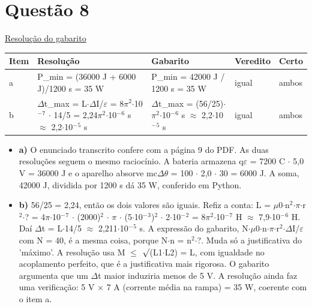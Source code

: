 \documentclass{article}%
\begin{document}
\section*{Questão 8}%
\href{https://poliedroresolve.sistemapoliedro.com.br/vestibulares/ita/2026/ita-2-fase-dia-3-30-10-2025-2-fase-dia-3/dissertativa-8-fisica-2-fase-dia-3-ita-2026}{Resolução do gabarito}\par\smallskip%
\begin{longtable}{@{}p{} p{} p{} p{} p{}@{}}\toprule Item & Resolução & Gabarito & Veredito & Certo \\ \midrule
a & P\_min = (36000 J + 6000 J)/1200 s = 35 W & P\_min = 42000 J / 1200 s = 35 W & igual & ambos \\
b & $\Delta$t\_max = L$\cdot$$\Delta$I/$\varepsilon$ = 8$\pi$$^2$$\cdot$10$^{-}$$^{7}$ $\cdot$ 14/5 = 2,24$\pi$$^2$$\cdot$10$^{-}$$^{6}$ s $\approx$ 2,2$\cdot$10$^{-}$$^{5}$ s & $\Delta$t\_max = (56/25)$\cdot$$\pi$$^2$$\cdot$10$^{-}$$^{6}$ s $\approx$ 2,2$\cdot$10$^{-}$$^{5}$ s & igual & ambos \\
\bottomrule\end{longtable}%
\begin{itemize}%
\item%
\textbf{a)} O enunciado transcrito confere com a página 9 do PDF. As duas resoluções seguem o mesmo raciocínio. A bateria armazena q$\varepsilon$ = 7200 C $\cdot$ 5,0 V = 36000 J e o aparelho absorve mc$\Delta$$\theta$ = 100 $\cdot$ 2,0 $\cdot$ 30 = 6000 J. A soma, 42000 J, dividida por 1200 s dá 35 W, conferido em Python.%
\item%
\textbf{b)} 56/25 = 2,24, então os dois valores são iguais. Refiz a conta: L = $\mu$0$\cdot$n$^2$$\cdot$$\pi$$\cdot$r$^2$$\cdot$? = 4$\pi$$\cdot$10$^{-}$$^{7}$ $\cdot$ (2000)$^2$ $\cdot$ $\pi$ $\cdot$ (5$\cdot$10$^{-}$$^3$)$^2$ $\cdot$ 2$\cdot$10$^{-}$$^2$ = 8$\pi$$^2$$\cdot$10$^{-}$$^{7}$ H $\approx$ 7,9$\cdot$10$^{-}$$^{6}$ H. Daí $\Delta$t = L$\cdot$14/5 $\approx$ 2,211$\cdot$10$^{-}$$^{5}$ s. A expressão do gabarito, N$\cdot$$\mu$0$\cdot$n$\cdot$$\pi$$\cdot$r$^2$$\cdot$$\Delta$I/$\varepsilon$ com N = 40, é a mesma coisa, porque N$\cdot$n = n$^2$$\cdot$?. Muda só a justificativa do 'máximo'. A resolução usa M $\leq$ $\surd$(L1$\cdot$L2) = L, com igualdade no acoplamento perfeito, que é a justificativa mais rigorosa. O gabarito argumenta que um $\Delta$t maior induziria menos de 5 V. A resolução ainda faz uma verificação: 5 V $\times$ 7 A (corrente média na rampa) = 35 W, coerente com o item a.%
\end{itemize}%
\end{document}
